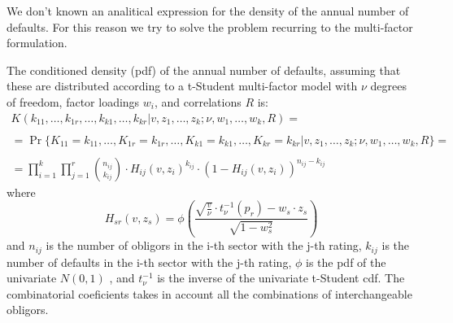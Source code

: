 \documentclass[11pt,fleqn]{book} %
\begin{document}
We don't known an analitical expression for the density of the annual 
number of defaults. For this reason we try to solve the problem recurring 
to the multi-factor formulation.

\begin{proposition}
The conditioned density (pdf) of the annual number of defaults, assuming 
that these are distributed according to a t-Student multi-factor model
with $\nu$ degrees of freedom, factor loadings $w_i$, and correlations
$R$ is:
\begin{displaymath}
\begin{array}{l}
K(k_{11},\dots,k_{1r},\dots,k_{k1},\dots,k_{kr} | v,z_1,\dots,z_k; \nu, w_1,\dots,w_k, R) = \\
\\
= \Pr\{K_{11}=k_{11},\dots,K_{1r}=k_{1r},\dots,K_{k1}=k_{k1},\dots,K_{kr}=k_{kr} | v,z_1,\dots,z_k; \nu, w_1,\dots,w_k, R\} = \\
\\
= \displaystyle \prod_{i=1}^k \prod_{j=1}^r \binom{n_{ij}}{k_{ij}} \cdot
  H_{ij}(v,z_i)^{k_{ij}} \cdot
  \left( 1 - H_{ij}(v,z_i) \right)^{n_{ij}-k_{ij}}
\end{array}
\end{displaymath}
where
\begin{displaymath}
H_{sr}(v,z_s) = \phi\left(  
\frac{\sqrt{\frac{v}{\nu}} \cdot t_{\nu}^{-1}(p_r) - w_s\cdot z_s}{\sqrt{1-w_s^2}}
\right)
\end{displaymath}
and $n_{ij}$ is the number of obligors in the i-th sector with the 
j-th rating, $k_{ij}$ is the number of defaults in the i-th sector 
with the j-th rating, $\phi$ is the pdf of the univariate $N(0,1)$
, and $t_{\nu}^{-1}$ is the inverse of the univariate t-Student cdf. 
The combinatorial coeficients takes in account all the combinations 
of interchangeable obligors.
\end{proposition}
\end{document}
